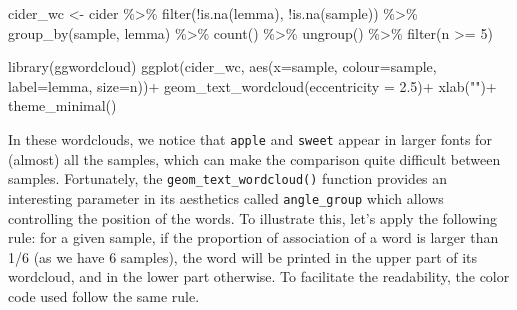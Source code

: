 \documentclass[
]{book}
\newenvironment{Shaded}{\begin{snugshade}}{\end{snugshade}}
\newcommand{\AttributeTok}[1]{\textcolor[rgb]{0.77,0.63,0.00}{#1}}
\newcommand{\DecValTok}[1]{\textcolor[rgb]{0.00,0.00,0.81}{#1}}
\newcommand{\FloatTok}[1]{\textcolor[rgb]{0.00,0.00,0.81}{#1}}
\newcommand{\FunctionTok}[1]{\textcolor[rgb]{0.00,0.00,0.00}{#1}}
\newcommand{\NormalTok}[1]{#1}
\newcommand{\OtherTok}[1]{\textcolor[rgb]{0.56,0.35,0.01}{#1}}
\newcommand{\SpecialCharTok}[1]{\textcolor[rgb]{0.00,0.00,0.00}{#1}}
\newcommand{\StringTok}[1]{\textcolor[rgb]{0.31,0.60,0.02}{#1}}
\begin{document}
\begin{Shaded}
\begin{Highlighting}[]
\NormalTok{cider\_wc }\OtherTok{\textless{}{-}}\NormalTok{ cider }\SpecialCharTok{\%\textgreater{}\%} 
  \FunctionTok{filter}\NormalTok{(}\SpecialCharTok{!}\FunctionTok{is.na}\NormalTok{(lemma), }\SpecialCharTok{!}\FunctionTok{is.na}\NormalTok{(sample)) }\SpecialCharTok{\%\textgreater{}\%} 
  \FunctionTok{group\_by}\NormalTok{(sample, lemma) }\SpecialCharTok{\%\textgreater{}\%} 
  \FunctionTok{count}\NormalTok{() }\SpecialCharTok{\%\textgreater{}\%} 
  \FunctionTok{ungroup}\NormalTok{() }\SpecialCharTok{\%\textgreater{}\%} 
  \FunctionTok{filter}\NormalTok{(n }\SpecialCharTok{\textgreater{}=} \DecValTok{5}\NormalTok{)}

\FunctionTok{library}\NormalTok{(ggwordcloud)}
\FunctionTok{ggplot}\NormalTok{(cider\_wc, }\FunctionTok{aes}\NormalTok{(}\AttributeTok{x=}\NormalTok{sample, }\AttributeTok{colour=}\NormalTok{sample, }\AttributeTok{label=}\NormalTok{lemma, }\AttributeTok{size=}\NormalTok{n))}\SpecialCharTok{+}
  \FunctionTok{geom\_text\_wordcloud}\NormalTok{(}\AttributeTok{eccentricity =} \FloatTok{2.5}\NormalTok{)}\SpecialCharTok{+}
  \FunctionTok{xlab}\NormalTok{(}\StringTok{""}\NormalTok{)}\SpecialCharTok{+}
  \FunctionTok{theme\_minimal}\NormalTok{()}
\end{Highlighting}
\end{Shaded}

In these wordclouds, we notice that \texttt{apple} and \texttt{sweet} appear in larger fonts for (almost) all the samples, which can make the comparison quite difficult between samples. Fortunately, the \texttt{geom\_text\_wordcloud()} function provides an interesting parameter in its aesthetics called \texttt{angle\_group} which allows controlling the position of the words. To illustrate this, let's apply the following rule: for a given sample, if the proportion of association of a word is larger than 1/6 (as we have 6 samples), the word will be printed in the upper part of its wordcloud, and in the lower part otherwise. To facilitate the readability, the color code used follow the same rule.
\end{document}
